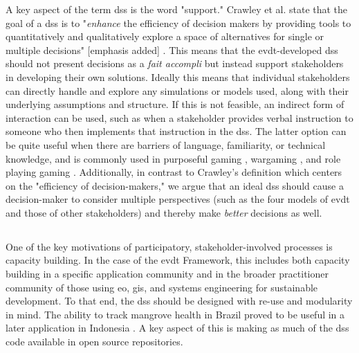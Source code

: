A key aspect of the term \ac{dss} is the word "support." Crawley et al. state that the goal of a \ac{dss} is to "\emph{enhance} the efficiency of decision makers by providing tools to quantitatively and qualitatively explore a space of alternatives for single or multiple decisions" [emphasis added] \cite{crawleySystemArchitectureStrategy2015}. This means that the \ac{evdt}-developed \ac{dss} should not present decisions as a \textit{fait accompli} but instead support stakeholders in developing their own solutions. Ideally this means that individual stakeholders can directly handle and explore any simulations or models used, along with their underlying assumptions and structure. If this is not feasible, an indirect form of interaction can be used, such as when a stakeholder provides verbal instruction to someone who then implements that instruction in the \ac{dss}. The latter option can be quite useful when there are barriers of language, familiarity, or technical knowledge, and is commonly used in purposeful gaming \cite{rossGamebasedLearningSystems2014}, wargaming \cite{hansonImprovingOperationalWargaming2016,selvaRevitalizingWargamingNecessary15,shlapakReinforcingDeterrenceNATO2016}, and role playing gaming \cite{groganStrategicEngineeringGaming2012,groganFederatedSimulationGaming2012}. Additionally, in contrast to Crawley's definition which centers on the "efficiency of decision-makers," we argue that an ideal \ac{dss} should cause a decision-maker to consider multiple perspectives (such as the four models of \ac{evdt} and those of other stakeholders) and thereby make \textit{better} decisions as well.

\subsection{} 

One of the key motivations of participatory, stakeholder-involved processes is capacity building. In the case of the \ac{evdt} Framework, this includes both capacity building in a specific application community and in the broader practitioner community of those using \ac{eo}, \ac{gis}, and systems engineering for sustainable development. To that end, the \ac{dss} should be designed with re-use and modularity in mind. The ability to track mangrove health in Brazil \cite{reidInteractiveModelAssessing2020} proved to be useful in a later application in Indonesia \cite{lombardoEnvironmentVulnerabilityDecisionTechnologyFrameworkDecision2022}. A key aspect of this is making as much of the \ac{dss} code available in open source repositories.

